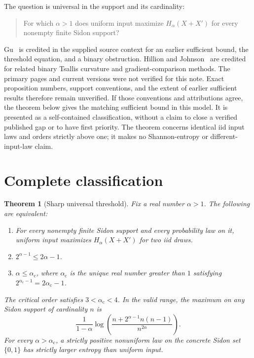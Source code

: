\documentclass[11pt,a4paper]{article}
\newtheorem{theorem}{Theorem}
\newcommand{\crit}{\alpha_{\mathrm c}}
\begin{document}
The question is universal in the support and its cardinality:
\begin{quote}
For which $\alpha>1$ does uniform input maximize $H_\alpha(X+X')$
for every nonempty finite Sidon support?
\end{quote}

Gu~\cite{Gu} is credited in the supplied source context for an earlier
sufficient bound, the threshold equation, and a binary obstruction.
Hillion and Johnson~\cite{HJ} are credited for related binary Tsallis curvature
and gradient-comparison methods. The primary pages and current versions were
not verified for this note. Exact proposition numbers, support conventions,
and the extent of earlier sufficient results therefore remain unverified.
If those conventions and attributions agree, the theorem below gives the
matching sufficient bound in this model. It is presented as a self-contained
classification, without a claim to close a verified published gap or to have
first priority. The theorem concerns identical iid input laws and orders
strictly above one; it makes no Shannon-entropy or different-input-law claim.

\section{Complete classification}

\begin{theorem}[Sharp universal threshold]\label{thm:main}
Fix a real number $\alpha>1$. The following are equivalent:
\begin{enumerate}[label=(\roman*),nosep]
\item For every nonempty finite Sidon support and every probability law
on it, uniform input maximizes $H_\alpha(X+X')$ for two iid draws.
\item $2^{\alpha-1}\le 2\alpha-1$.
\item $\alpha\le\crit$, where $\crit$ is the unique real number greater
than $1$ satisfying $2^{\crit-1}=2\crit-1$.
\end{enumerate}
The critical order satisfies $3<\crit<4$. In the valid range, the maximum
on any Sidon support of cardinality $n$ is
\begin{equation}\label{eq:max}
\frac{1}{1-\alpha}\log\left(
\frac{n+2^{\alpha-1}n(n-1)}{n^{2\alpha}}\right).
\end{equation}
For every $\alpha>\crit$, a strictly positive nonuniform law on the concrete
Sidon set $\{0,1\}$ has strictly larger entropy than uniform input.
\end{theorem}
\end{document}
